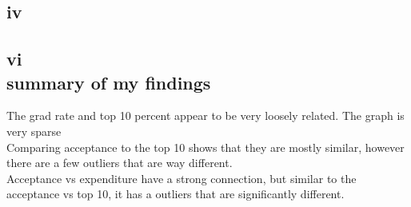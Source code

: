 \documentclass{article}
\begin{document}
\subsection*{iv}

\subsection*{vi\\summary of my findings}


The grad rate and top 10 percent appear to be very loosely related. The graph is very sparse\\

Comparing acceptance to the top 10 shows that they are mostly similar, however there are a few outliers that are way different.\\

Acceptance vs expenditure have a strong connection, but similar to the acceptance vs top 10, it has a outliers that are significantly different.\\
\end{document}
